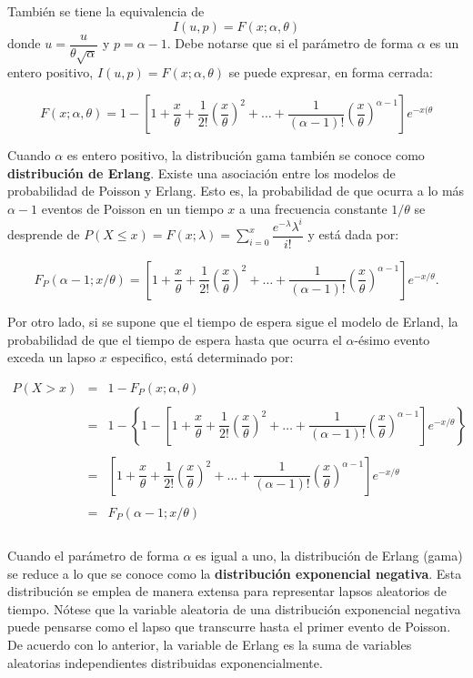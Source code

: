 También se tiene la equivalencia de 
$$I(u,p)=F(x;\alpha,\theta)$$
donde $u=\dfrac{u}{\theta\sqrt{\alpha}}$ y $p=\alpha-1$. Debe notarse que si el parámetro de forma $\alpha$ es un entero positivo, $I(u,p)=F(x;\alpha,\theta)$ se puede expresar, en forma cerrada:

$$F(x;\alpha,\theta)=1-\left[1+\dfrac{x}{\theta}+\dfrac{1}{2!}\left(\dfrac{x}{\theta}\right)^2+\ldots + \dfrac{1}{(\alpha-1)!}\left(\dfrac{x}{\theta}\right)^{\alpha-1}\right]e^{-x(\theta}$$

Cuando $\alpha$ es entero positivo, la distribución gama también se conoce como \textbf{distribución de Erlang}. Existe una asociación entre los modelos de probabilidad de Poisson y Erlang. Esto es, la probabilidad de que ocurra a lo más $\alpha-1$ eventos de Poisson en un tiempo $x$ a una frecuencia constante $1/\theta$ se desprende de $P(X\leq x)=F(x;\lambda)=\sum\limits_{i=0}^x \dfrac{e^{-\lambda}\lambda^i}{i!}$ y está dada por:

$$F_P(\alpha-1;x/\theta)=\left[1+\dfrac{x}{\theta}+\dfrac{1}{2!}\left(\dfrac{x}{\theta}\right)^2+\ldots + \dfrac{1}{(\alpha-1)!}\left(\dfrac{x}{\theta}\right)^{\alpha-1}\right]e^{-x/\theta}.$$

Por otro lado, si se supone que el tiempo de espera sigue el modelo de Erland, la probabilidad de que el tiempo de espera hasta que ocurra el $\alpha$-ésimo evento exceda un lapso $x$ especifico, está determinado por:

$$\begin{array}{rcl}
    P(X>x)&=&1-F_P(x;\alpha,\theta)\\\\
	  &=&1-\left\{1-\left[1+\dfrac{x}{\theta}+\dfrac{1}{2!}\left(\dfrac{x}{\theta}\right)^2+\ldots + \dfrac{1}{(\alpha-1)!}\left(\dfrac{x}{\theta}\right)^{\alpha-1}\right]e^{-x/\theta}\right\}\\\\
	  &=&\left[1+\dfrac{x}{\theta}+\dfrac{1}{2!}\left(\dfrac{x}{\theta}\right)^2+\ldots + \dfrac{1}{(\alpha-1)!}\left(\dfrac{x}{\theta}\right)^{\alpha-1}\right]e^{-x/\theta}\\\\
	  &=&F_P(\alpha-1;x/\theta)\\\\
\end{array}$$

Cuando el parámetro de forma $\alpha$ es igual a uno, la distribución de Erlang (gama) se reduce a lo que se conoce como la \textbf{distribución exponencial negativa}. Esta distribución se emplea de manera extensa para representar lapsos aleatorios de tiempo. Nótese que la variable aleatoria de una distribución exponencial negativa puede pensarse como el lapso que transcurre hasta el primer evento de Poisson. De acuerdo con lo anterior, la variable de Erlang es la suma de variables aleatorias independientes distribuidas exponencialmente.\\\\

